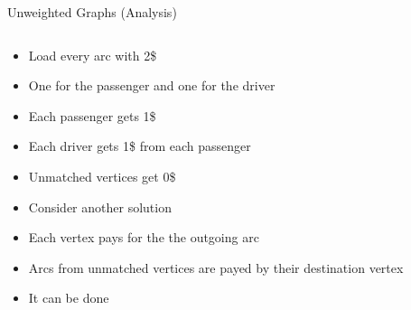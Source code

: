 \begin{frame}[<+->]{Unweighted Graphs (Analysis)}
\begin{columns}
	\begin{column}{.5\textwidth}
	\begin{itemize}
	  \item Load every arc with 2\$
	  \item One for the passenger and one for the driver
	  \item Each passenger gets 1\$
	  \item Each driver gets 1\$ from each passenger
	  \item Unmatched vertices get 0\$
	\end{itemize}
	\begin{itemize}
	  \item Consider another solution
	  \item Each vertex pays for the the outgoing arc
	  \item Arcs from unmatched vertices are payed by their destination vertex
	  \item It can be done 
	\end{itemize}
	\end{column}
	\begin{column}{.5\textwidth}
	\centering
	
	\end{column}
\end{columns}
\end{frame}